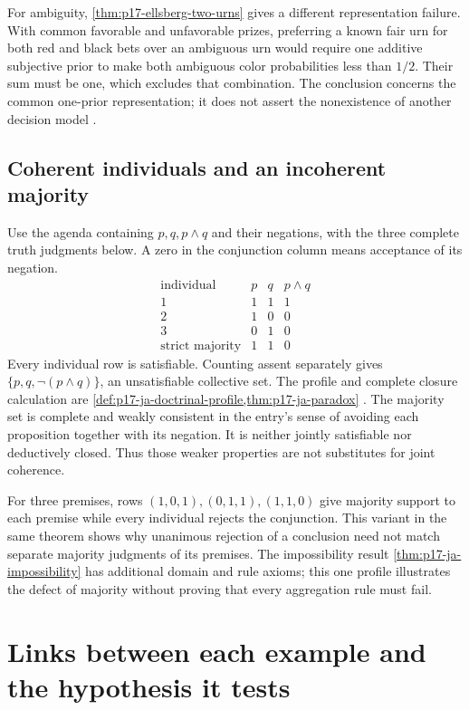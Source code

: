 For ambiguity, \cref{thm:p17-ellsberg-two-urns} gives a different
representation failure. With common favorable and unfavorable prizes,
preferring a known fair urn for both red and black bets over an ambiguous
urn would require one additive subjective prior to make both ambiguous
color probabilities less than \(1/2\). Their sum must be one, which
excludes that combination. The conclusion concerns the common one-prior
representation; it does not assert the nonexistence of another decision
model \cite{Ellsberg1961Ambiguity}.

\subsection{Coherent individuals and an incoherent majority}
\label{sec:p14-counter-aggregation}

Use the agenda containing \(p,q,p\land q\) and their negations, with the
three complete truth judgments below. A zero in the conjunction column means
acceptance of its negation.
\[
\begin{array}{c|ccc}
 \text{individual}&p&q&p\land q\\\hline
 1&1&1&1\\
 2&1&0&0\\
 3&0&1&0\\\hline
 \text{strict majority}&1&1&0
\end{array}
\]
Every individual row is satisfiable. Counting assent separately gives
\(\{p,q,\neg(p\land q)\}\), an unsatisfiable collective set. The
profile and complete closure calculation are
\cref{def:p17-ja-doctrinal-profile,thm:p17-ja-paradox}
\cite{ListPettit2001JudgmentPreprint}. The majority set is complete and
weakly consistent in the entry's sense of avoiding each proposition together
with its negation. It is neither jointly satisfiable nor deductively closed.
Thus those weaker properties are not substitutes for joint coherence.

For three premises, rows \((1,0,1),(0,1,1),(1,1,0)\) give majority
support to each premise while every individual rejects the conjunction.
This variant in the same theorem shows why unanimous rejection of a
conclusion need not match separate majority judgments of its premises.
The impossibility result \cref{thm:p17-ja-impossibility} has additional
domain and rule axioms; this one profile illustrates the defect of majority
without proving that every aggregation rule must fail.

\section{Links between each example and the hypothesis it tests}
\label{sec:p14-counter-hypothesis-links}

